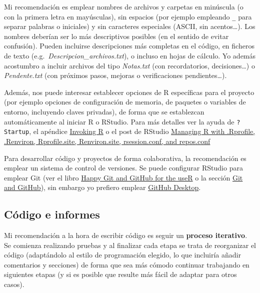 \documentclass[
]{book}
\theoremstyle{break}
\theoremstyle{nonumberplain}
\begin{document}
Mi recomendación es emplear nombres de archivos y carpetas en minúscula (o con la primera letra en mayúsculas), sin espacios (por ejemplo empleando \texttt{\_} para separar palabras o iniciales) y sin caracteres especiales (ASCII, sin acentos\ldots).
Los nombres deberían ser lo más descriptivos posibles (en el sentido de evitar confusión).
Pueden incluirse descripciones más completas en el código, en ficheros de texto (e.g.~\emph{Descripcion\_archivos.txt}), o incluso en hojas de cálculo.
Yo además acostumbro a incluir archivos del tipo \emph{Notas.txt} (con recordatorios, decisiones\ldots) o \emph{Pendente.txt} (con próximos pasos, mejoras o verificaciones pendientes\ldots).

Además, nos puede interesar establecer opciones de R específicas para el proyecto (por ejemplo opciones de configuración de memoria, de paquetes o variables de entorno, incluyendo claves privadas), de forma que se establezcan automáticamente al iniciar R o RStudio.
Para más detalles ver la ayuda de \texttt{?Startup}, el apéndice \href{https://cran.r-project.org/doc/manuals/r-release/R-intro.html\#Invoking-R}{Invoking R} o el post de RStudio
\href{https://support.posit.co/hc/en-us/articles/360047157094-Managing-R-with-Rprofile-Renviron-Rprofile-site-Renviron-site-rsession-conf-and-repos-conf}{Managing R with .Rprofile, .Renviron, Rprofile.site, Renviron.site, rsession.conf, and repos.conf}

Para desarrollar código y proyectos de forma colaborativa, la recomendación es emplear un sistema de control de versiones.
Se puede configurar RStudio para emplear Git (ver el libro \href{https://happygitwithr.com/index.html}{Happy Git and GitHub for the useR} o la sección \href{https://r-pkgs.org/software-development-practices.html\#sec-sw-dev-practices-git-github}{Git and GitHub}), sin embargo yo prefiero emplear \href{https://desktop.github.com/}{GitHub Desktop}.

\hypertarget{codigo}{%
\subsection{Código e informes}\label{codigo}}

Mi recomendación a la hora de escribir código es seguir un \textbf{proceso iterativo}.
Se comienza realizando pruebas y al finalizar cada etapa se trata de reorganizar el código (adaptándolo al estilo de programación elegido, lo que incluiría añadir comentarios y secciones) de forma que sea más cómodo continuar trabajando en siguientes etapas (y si es posible que resulte más fácil de adaptar para otros casos).
\end{document}
